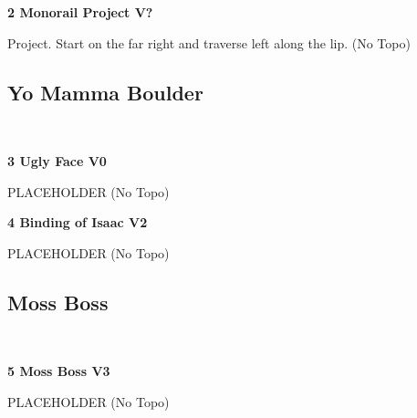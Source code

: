 \begin{multicols}{2}
					\begin{minipage}{\linewidth}	
					\label{rt:Monorail Project}\colorbox{black!20}{\textbf{2 Monorail Project V?  }}
					\begin{adjustwidth}{0.5cm}{}				
					Project. Start on the far right and traverse left along the lip.
						\newline (No Topo) 
					\end{adjustwidth}
					\end{minipage}
			\subsection*{Yo Mamma Boulder}\label{bf:Yo Mamma Boulder}
			\begin{minipage}{\columnwidth}
			\
			\end{minipage}
			
					\begin{minipage}{\linewidth}	
					\label{rt:Ugly Face}\colorbox{green!20}{\textbf{3 Ugly Face V0 \ding{72}  \warn }}
					\begin{adjustwidth}{0.5cm}{}				
					PLACEHOLDER
						\newline (No Topo) 
					\end{adjustwidth}
					\end{minipage}
					\begin{minipage}{\linewidth}	
					\label{rt:Binding of Isaac}\colorbox{green!20}{\textbf{4 Binding of Isaac V2  \ding{72}  \warn }}
					\begin{adjustwidth}{0.5cm}{}				
					PLACEHOLDER
						\newline (No Topo) 
					\end{adjustwidth}
					\end{minipage}
			\subsection*{Moss Boss}\label{bf:Moss Boss}
			\begin{minipage}{\columnwidth}
			\
			\end{minipage}
			
					\begin{minipage}{\linewidth}	
					\label{rt:Moss Boss}\colorbox{green!20}{\textbf{5 Moss Boss V3   }}
					\begin{adjustwidth}{0.5cm}{}				
					PLACEHOLDER
						\newline (No Topo) 
					\end{adjustwidth}
					\end{minipage}

\end{multicols}
